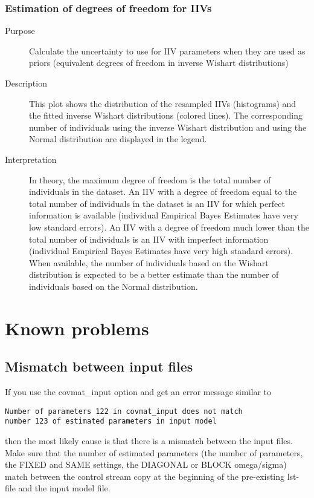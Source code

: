 \subsubsection{Estimation of degrees of freedom for IIVs }
\begin{description}
\item[Purpose] Calculate the uncertainty to use for IIV parameters when they are used as priors (equivalent degrees of freedom in
inverse Wishart distributions) 
\item[Description] This plot shows the distribution of the resampled IIVs (histograms) and the fitted inverse Wishart distributions (colored lines).
The corresponding number of individuals using the inverse Wishart distribution and using the Normal distribution
are displayed in the legend. 
\item[Interpretation] In theory, the maximum degree of freedom is the total number of individuals in the dataset.
An IIV with a degree of freedom equal to the total number of individuals in the dataset is an IIV for which perfect
information is available (individual Empirical Bayes Estimates have very low standard errors). An IIV with a degree
of freedom much lower than the total number of individuals is an IIV with imperfect information (individual Empirical
Bayes Estimates have very high standard errors). When available, the number of individuals based on the Wishart
distribution is expected to be a better estimate than the number of individuals based on the Normal distribution.
\end{description}

\section{Known problems}
\subsection*{Mismatch between input files}
If you use the covmat\_input option and get an error message similar to
\begin{verbatim}
Number of parameters 122 in covmat_input does not match 
number 123 of estimated parameters in input model
\end{verbatim}
then the most likely cause is that there is a mismatch between the input files. Make sure that the number of
estimated parameters (the number of parameters, the FIXED and SAME settings, the DIAGONAL or BLOCK omega/sigma)
match between the control stream copy at the beginning of the pre-existing lst-file and the input model file.
